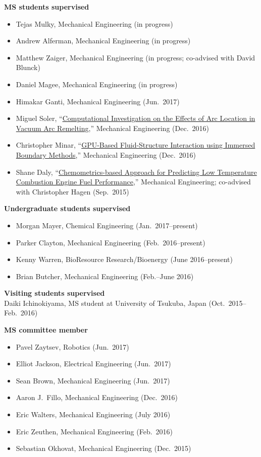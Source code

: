 \documentclass[margin,line,11pt]{res}
\begin{document}
\begin{resume}
\textbf{MS students supervised}
\begin{itemize}[leftmargin=*]
    \item Tejas Mulky, Mechanical Engineering (in progress)
    \item Andrew Alferman, Mechanical Engineering (in progress)
    \item Matthew Zaiger, Mechanical Engineering (in progress; co-advised with David Blunck)
    \item Daniel Magee, Mechanical Engineering (in progress)
    \item Himakar Ganti, Mechanical Engineering (Jun.~2017)
    \item Miguel Soler, ``\href{http://hdl.handle.net/1957/60070}{Computational Investigation on the Effects of Arc Location in Vacuum Arc Remelting},'' Mechanical Engineering (Dec.\ 2016)
    \item Christopher Minar, ``\href{http://hdl.handle.net/1957/60147}{GPU-Based Fluid-Structure Interaction using Immersed Boundary Methods},'' Mechanical Engineering (Dec.\ 2016)
    \item Shane Daly, ``\href{http://hdl.handle.net/1957/57465}{Chemometrics-based Approach for Predicting Low Temperature Combustion Engine Fuel Performance},'' Mechanical Engineering; co-advised with Christopher Hagen (Sep.\ 2015)
\end{itemize}

\textbf{Undergraduate students supervised}
\begin{itemize}[leftmargin=*]
    \item Morgan Mayer, Chemical Engineering (Jan.~2017--present)
    \item Parker Clayton, Mechanical Engineering (Feb.~2016--present)
    \item Kenny Warren, BioResource Research\slash Bioenergy (June 2016--present)
    \item Brian Butcher, Mechanical Engineering (Feb.--June 2016)
\end{itemize}

\textbf{Visiting students supervised} \\
Daiki Ichinokiyama, MS student at University of Tsukuba, Japan (Oct.~2015--Feb.~2016)


\textbf{MS committee member}
\begin{itemize}[leftmargin=*]
    \item Pavel Zaytsev, Robotics (Jun.~2017)
    \item Elliot Jackson, Electrical Engineering (Jun.~2017)
    \item Sean Brown, Mechanical Engineering (Jun.~2017)
    \item Aaron J.~Fillo, Mechanical Engineering (Dec.~2016)
    \item Eric Walters, Mechanical Engineering (July 2016)
    \item Eric Zeuthen, Mechanical Engineering (Feb.~2016)
    \item Sebastian Okhovat, Mechanical Engineering (Dec.~2015)
\end{itemize}


\end{resume}
\end{document}
